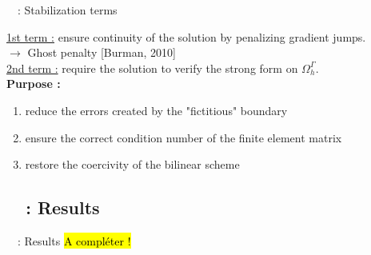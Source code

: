 \begin{frame}{\appendixname~\theappendixframenumber~: Stabilization terms}
	\begin{center}
		\centering
	\end{center}
	\small
	\underline{1st term :} ensure continuity of the solution by penalizing gradient jumps. \\
	$\rightarrow$ Ghost penalty [Burman, 2010] \\
	\underline{2nd term :} require the solution to verify the strong form on $\Omega_h^\Gamma$. \\
	\normalsize
	\textbf{Purpose :} 
	\begin{enumerate}[\ding{217}]
		\item reduce the errors created by the "fictitious" boundary 
		\item ensure the correct condition number of the finite element matrix
		\item restore the coercivity of the bilinear scheme
	\end{enumerate}
\end{frame}
\addtocounter{appendixframenumber}{1}

\subsection{\appendixname~\theappendixframenumber~: Results}

\begin{frame}{\appendixname~\theappendixframenumber~: Results}
	\hl{A compléter !}
\end{frame}
\addtocounter{appendixframenumber}{1}
